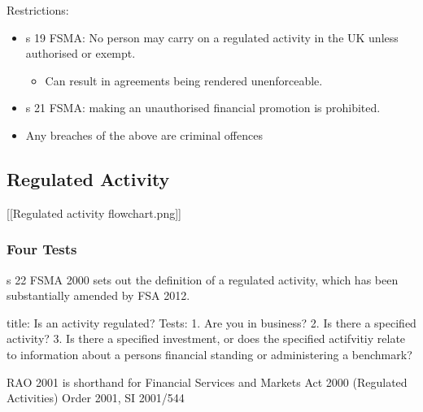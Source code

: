 \documentclass[
]{article}
\newenvironment{Shaded}{}{}
\newcommand{\NormalTok}[1]{#1}
\providecommand{\tightlist}{%
  \setlength{\itemsep}{0pt}\setlength{\parskip}{0pt}}
\begin{document}
Restrictions:

\begin{itemize}
\tightlist
\item
  s 19 FSMA: No person may carry on a regulated activity in the UK
  unless authorised or exempt.

  \begin{itemize}
  \tightlist
  \item
    Can result in agreements being rendered unenforceable.
  \end{itemize}
\item
  s 21 FSMA: making an unauthorised financial promotion is prohibited.
\item
  Any breaches of the above are criminal offences
\end{itemize}

\hypertarget{regulated-activity}{%
\subsection{Regulated Activity}\label{regulated-activity}}

{[}{[}Regulated activity flowchart.png{]}{]}

\hypertarget{four-tests}{%
\subsubsection{Four Tests}\label{four-tests}}

s 22 FSMA 2000 sets out the definition of a regulated activity, which
has been substantially amended by FSA 2012.

\begin{Shaded}
\begin{Highlighting}[]
\NormalTok{title: Is an activity regulated?}
\NormalTok{Tests:}
\NormalTok{1. Are you in business?}
\NormalTok{2. Is there a specified activity?}
\NormalTok{3. Is there a specified investment, or does the specified actifvitiy relate to information about a person\textquotesingle{}s financial standing or administering a benchmark?}
\end{Highlighting}
\end{Shaded}

\begin{Shaded}
\begin{Highlighting}[]
\NormalTok{RAO 2001 is shorthand for Financial Services and Markets Act 2000 (Regulated Activities) Order 2001, SI 2001/544}
\end{Highlighting}
\end{Shaded}
\end{document}
